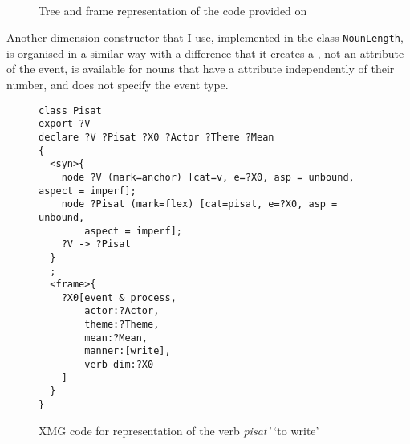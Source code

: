 \begin{figure}
\medskip\\
\caption{Tree and frame representation of the code provided on \label{card:tree:frame}}
\end{figure}

Another dimension constructor that I use, implemented in the class \texttt{NounLength},  is organised in a similar way with a difference that it creates a \NOUNDIM, not an \MDIM attribute of the event, is available for nouns that have a \LENGTH attribute independently of their number, and does not specify the event type.

\begin{figure}
\begin{lstlisting}[style=xmg,basicstyle=\small\ttfamily]
class Pisat
export ?V
declare ?V ?Pisat ?X0 ?Actor ?Theme ?Mean
{
  <syn>{
    node ?V (mark=anchor) [cat=v, e=?X0, asp = unbound, aspect = imperf];
    node ?Pisat (mark=flex) [cat=pisat, e=?X0, asp = unbound, 
    	aspect = imperf];
    ?V -> ?Pisat
  }
  ;
  <frame>{
    ?X0[event & process,
        actor:?Actor,
        theme:?Theme,
        mean:?Mean,
        manner:[write],
        verb-dim:?X0
    ]
  }
}
\end{lstlisting}
\caption{XMG code for representation of the verb \textit{pisat'} `to write' \label{xmg:pisat}}
\end{figure}

